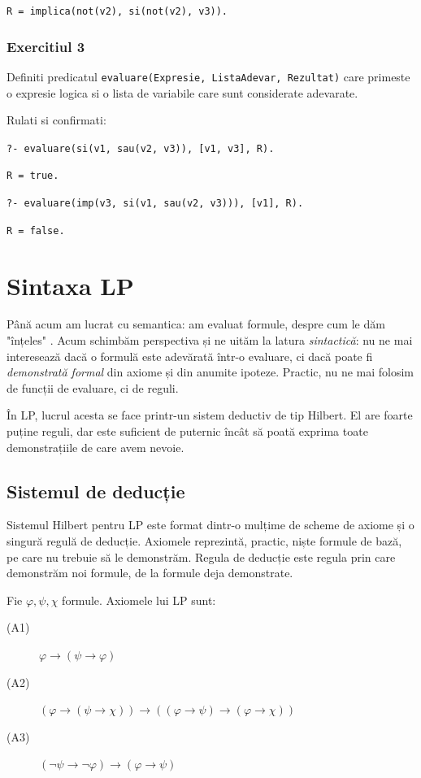 \texttt{R = implica(not(v2), si(not(v2), v3)).}

\subsubsection*{Exercitiul 3}
Definiti predicatul \texttt{evaluare(Expresie, ListaAdevar, Rezultat)} care primeste
o expresie logica si o lista de variabile care sunt considerate adevarate.

Rulati si confirmati:

\texttt{?- evaluare(si(v1, sau(v2, v3)), [v1, v3], R).}

\texttt{R = true.}

\texttt{?- evaluare(imp(v3, si(v1, sau(v2, v3))), [v1], R).}

\texttt{R = false.}

\newpage

\section{Sintaxa LP}

Până acum am lucrat cu semantica: am evaluat formule, despre cum le dăm "înțeles" .
Acum schimbăm perspectiva și ne uităm la latura \textit{sintactică}: nu ne mai interesează dacă o formulă este adevărată într-o evaluare, ci dacă poate fi
\textit{demonstrată formal} din axiome și din anumite ipoteze. Practic, nu ne mai folosim de funcții de evaluare, ci de reguli.

În LP, lucrul acesta se face printr-un sistem deductiv de tip Hilbert. El are foarte puține reguli, dar este suficient de puternic încât să poată exprima
toate demonstrațiile de care avem nevoie.

\subsection{Sistemul de deducție}

Sistemul Hilbert pentru LP este format dintr-o mulțime de scheme de axiome și o singură regulă de deducție. Axiomele reprezintă, practic, niște formule
de bază, pe care nu trebuie să le demonstrăm. Regula de deducție este regula prin care demonstrăm noi formule, de la formule deja demonstrate.


Fie \( \varphi, \psi, \chi \) formule. Axiomele lui LP sunt:

\begin{description}
	\item[(A1)] \( \varphi \to (\psi \to \varphi) \)
	\item[(A2)] \( (\varphi \to (\psi \to \chi)) \to ((\varphi \to \psi) \to (\varphi \to \chi)) \)
	\item[(A3)] \( (\neg \psi \to \neg \varphi) \to (\varphi \to \psi) \)
\end{description}

